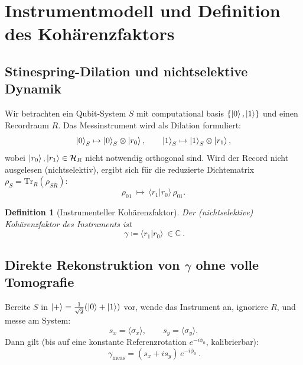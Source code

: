 \documentclass[11pt,a4paper]{article}
\newtheorem{definition}{Definition}
\newcommand{\C}{\mathbb{C}}
\begin{document}
	\section{Instrumentmodell und Definition des Kohärenzfaktors}
	
	\subsection{Stinespring-Dilation und nichtselektive Dynamik}
	
	Wir betrachten ein Qubit-System \(S\) mit computational basis \(\{\ket0,\ket1\}\) und einen Recordraum \(R\).
	Das Messinstrument wird als Dilation formuliert:
	\begin{equation}
		\ket0_S \mapsto \ket0_S\otimes \ket{r_0},\qquad
		\ket1_S \mapsto \ket1_S\otimes \ket{r_1},
		\label{eq:dilation}
	\end{equation}
	wobei \(\ket{r_0},\ket{r_1}\in\mathcal{H}_R\) nicht notwendig orthogonal sind.
	Wird der Record nicht ausgelesen (nichtselektiv), ergibt sich für die reduzierte Dichtematrix
	\(\rho_S=\mathrm{Tr}_R(\rho_{SR})\):
	\begin{equation}
		\rho_{01}\ \mapsto\ \langle r_1|r_0\rangle\,\rho_{01}.
	\end{equation}
	
	\begin{definition}[Instrumenteller Kohärenzfaktor]
		Der (nichtselektive) Kohärenzfaktor des Instruments ist
		\begin{equation}
			\boxed{\ \gamma \coloneqq \langle r_1|r_0\rangle\ \in\C\ }.
			\label{eq:gamma_def}
		\end{equation}
	\end{definition}
	
	\subsection{Direkte Rekonstruktion von \(\gamma\) ohne volle Tomografie}
	
	Bereite \(S\) in \(\ket{+}=\tfrac1{\sqrt2}(\ket0+\ket1)\) vor, wende das Instrument an, ignoriere \(R\),
	und messe am System:
	\[
	s_x=\langle\sigma_x\rangle,\qquad s_y=\langle\sigma_y\rangle.
	\]
	Dann gilt (bis auf eine konstante Referenzrotation \(e^{-i\phi_0}\), kalibrierbar):
	\begin{equation}
		\boxed{\ \gamma_{\mathrm{meas}} = (s_x+i s_y)\,e^{-i\phi_0}\ }.
		\label{eq:gamma_meas}
	\end{equation}
	
\end{document}
